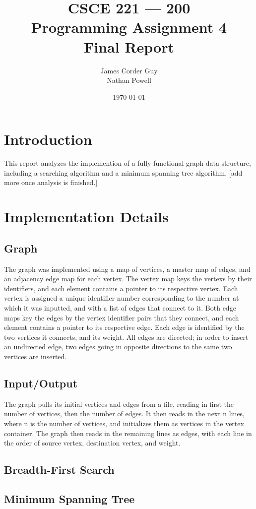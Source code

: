 \documentclass[titlepage]{article}
\title{
	\textbf{
		CSCE 221 --- 200 \\
		Programming Assignment 4 \\
		Final Report
	}
}
\author{
	James Corder Guy \\
	Nathan Powell
}
\date{
	\today
}
\begin{document}
	\maketitle
	\begin{multicols}{2}
		\section{Introduction}
                This report analyzes the implemention of a fully-functional graph data structure, including a searching algorithm and a minimum spanning tree algorithm. [add more once analysis is finished.]
		\section{Implementation Details}
			\subsection{Graph}
                        The graph was implemented using a map of vertices, a master map of edges, and an adjacency edge map for each vertex. The vertex map keys the vertexs by their identifiers, and each element contains a pointer to its respective vertex. Each vertex is assigned a unique identifier number corresponding to the number at which it was inputted, and with a list of edges that connect to it. Both edge maps key the edges by the vertex identifier pairs that they connect, and each element contains a pointer to its respective edge. Each edge is identified by the two vertices it connects, and its weight. All edges are directed; in order to insert an undirected edge, two edges going in opposite directions to the same two vertices are inserted.
			\subsection{Input/Output}
                        The graph pulls its initial vertices and edges from a file, reading in first the number of vertices, then the number of edges. It then reads in the next n lines, where n is the number of vertices, and initializes them as vertices in the vertex container. The graph then reads in the remaining lines as edges, with each line in the order of source vertex, destination vertex, and weight.
			\subsection{Breadth-First Search}
			\subsection{Minimum Spanning Tree}


\end{multicols}
\end{document}
